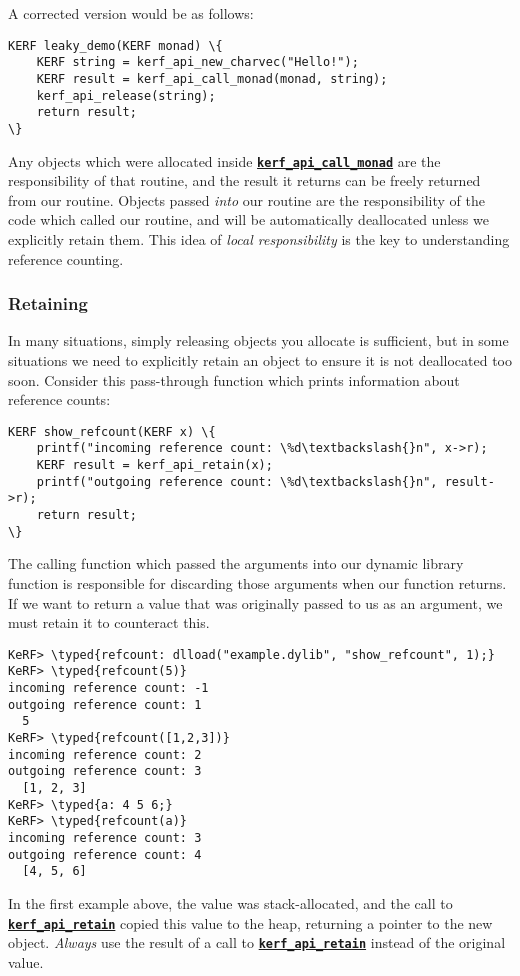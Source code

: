 \documentclass{article}
\newcommand{\typed}[1]{\textcolor{TealBlue}{#1}}
\newcommand{\ffi}[2]{\hyperref[ffi:#2]{\textbf{\texttt{#1}}}}
\begin{document}
A corrected version would be as follows:
\begin{Verbatim}
KERF leaky_demo(KERF monad) \{
	KERF string = kerf_api_new_charvec("Hello!");
	KERF result = kerf_api_call_monad(monad, string);
	kerf_api_release(string);
	return result;
\}
\end{Verbatim}
Any objects which were allocated inside \ffi{kerf\_api\_call\_monad}{kerfApiCallMonad} are the responsibility of that routine, and the result it returns can be freely returned from our routine. Objects passed \emph{into} our routine are the responsibility of the code which called our routine, and will be automatically deallocated unless we explicitly retain them. This idea of \emph{local responsibility} is the key to understanding reference counting.

\pagebreak
\subsubsection{Retaining}
In many situations, simply releasing objects you allocate is sufficient, but in some situations we need to explicitly retain an object to ensure it is not deallocated too soon. Consider this pass-through function which prints information about reference counts:

\begin{Verbatim}
KERF show_refcount(KERF x) \{
	printf("incoming reference count: \%d\textbackslash{}n", x->r);
	KERF result = kerf_api_retain(x);
	printf("outgoing reference count: \%d\textbackslash{}n", result->r);
	return result;
\}
\end{Verbatim}

The calling function which passed the arguments into our dynamic library function is responsible for discarding those arguments when our function returns. If we want to return a value that was originally passed to us as an argument, we must retain it to counteract this.

\begin{Verbatim}
KeRF> \typed{refcount: dlload("example.dylib", "show_refcount", 1);}
KeRF> \typed{refcount(5)}
incoming reference count: -1
outgoing reference count: 1
  5
KeRF> \typed{refcount([1,2,3])}
incoming reference count: 2
outgoing reference count: 3
  [1, 2, 3]
KeRF> \typed{a: 4 5 6;}
KeRF> \typed{refcount(a)}
incoming reference count: 3
outgoing reference count: 4
  [4, 5, 6]
\end{Verbatim}

In the first example above, the value was stack-allocated, and the call to \ffi{kerf\_api\_retain}{kerfApiRetain} copied this value to the heap, returning a pointer to the new object. \emph{Always} use the result of a call to \ffi{kerf\_api\_retain}{kerfApiRetain} instead of the original value.
\end{document}
